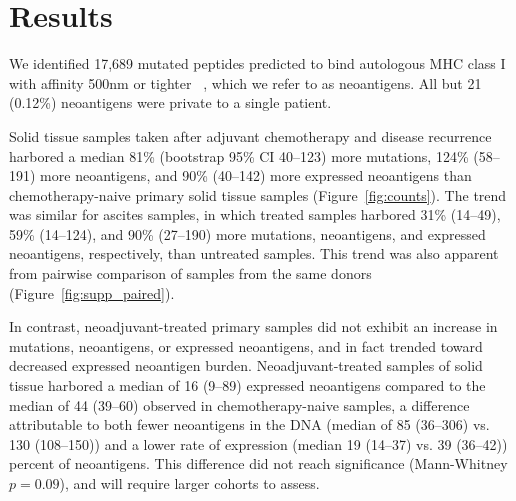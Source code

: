 \section*{Results}


We identified 17,689 mutated peptides predicted to bind autologous MHC class I with affinity 500nm or tighter ~\cite{Sette1994}, which we refer to as neoantigens. All but 21 (0.12\%) neoantigens were private to a single patient.

Solid tissue samples taken after adjuvant chemotherapy and disease recurrence harbored a median 81\% (bootstrap 95\% CI 40--123) more mutations, 124\% (58--191) more neoantigens, and 90\% (40--142) more expressed neoantigens than chemotherapy-naive primary solid tissue samples (Figure~\ref{fig:counts}). The trend was similar for ascites samples, in which treated samples harbored 31\% (14--49), 59\% (14--124), and 90\% (27--190) more mutations, neoantigens, and expressed neoantigens, respectively, than untreated samples. This trend was also apparent from pairwise comparison of samples from the same donors (Figure~\ref{fig:supp_paired}). 


In contrast, neoadjuvant-treated primary samples did not exhibit an increase in mutations, neoantigens, or expressed neoantigens, and in fact trended toward decreased expressed neoantigen burden. Neoadjuvant-treated samples of solid tissue harbored a median of 16 (9--89) expressed neoantigens compared to the median of 44 (39--60) observed in chemotherapy-naive samples, a difference attributable to both fewer neoantigens in the DNA (median of 85 (36--306) vs. 130 (108--150)) and a lower rate of expression (median 19 (14--37) vs. 39 (36--42)) percent of neoantigens. This difference did not reach significance (Mann-Whitney $p=0.09$), and will require larger cohorts to assess.

